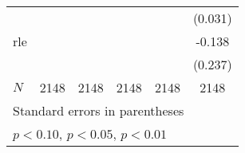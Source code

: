 {\begin{tabular}{l*{5}{c}}
            &                     &                     &                     &                     &     (0.031)         \\
\addlinespace
rle         &                     &                     &                     &                     &      -0.138         \\
            &                     &                     &                     &                     &     (0.237)         \\
\midrule
\(N\)       &        2148         &        2148         &        2148         &        2148         &        2148         \\
\bottomrule
\multicolumn{6}{l}{\footnotesize Standard errors in parentheses}\\
\multicolumn{6}{l}{\footnotesize \sym{*} \(p<0.10\), \sym{**} \(p<0.05\), \sym{***} \(p<0.01\)}\\
\end{tabular}
}
